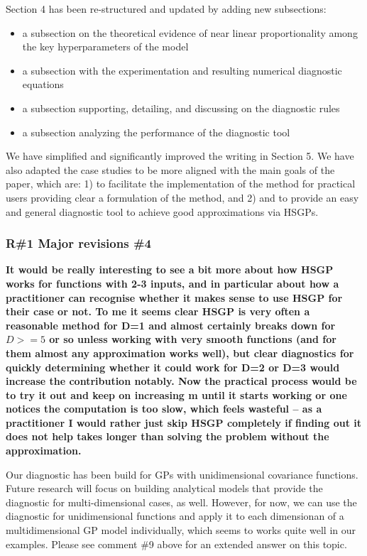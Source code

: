\documentclass[11pt]{report}
\begin{document}
Section 4 has been re-structured and updated by adding new subsections:
\begin{itemize}
	\item a subsection on the theoretical evidence of near linear proportionality among the key hyperparameters of the model
	\item a subsection with the experimentation and resulting numerical diagnostic equations
	\item a subsection supporting, detailing, and discussing on the diagnostic rules
	\item a subsection analyzing the performance of the diagnostic tool
\end{itemize}


We have simplified and significantly improved the writing in Section 5. We have also adapted the case studies to be more aligned with the main goals of the paper, which are: 1) to facilitate the implementation of the method for practical users providing clear a formulation of the method, and 2) and to provide an easy and general diagnostic tool to achieve good approximations via HSGPs.
 

\subsubsection*{R\#1 Major revisions \#4}

\textbf{It would be really interesting to see a bit more about how HSGP works for functions with 2-3 inputs, and in particular about how a practitioner can recognise whether it makes sense to use HSGP for their case or not. To me it seems clear HSGP is very often a reasonable method for D=1 and almost certainly breaks down for $D>=5$ or so unless working with very smooth functions (and for them almost any approximation works well), but clear diagnostics for quickly determining whether it could work for D=2 or D=3 would increase the contribution notably. Now the practical process would be to try it out and keep on increasing m until it starts working or one notices the computation is too slow, which feels wasteful -- as a practitioner I would rather just skip HSGP completely if finding out it does not help takes longer than solving the problem without the approximation.}

Our diagnostic has been build for GPs with unidimensional covariance functions. Future research will focus on building analytical models that provide the diagnostic for multi-dimensional cases, as well. However, for now, we can use the diagnostic for unidimensional functions and apply it to each dimensionan of a multidimensional GP model individually, which seems to works quite well in our examples. Please see comment \#9 above for an extended answer on this topic.
\end{document}
